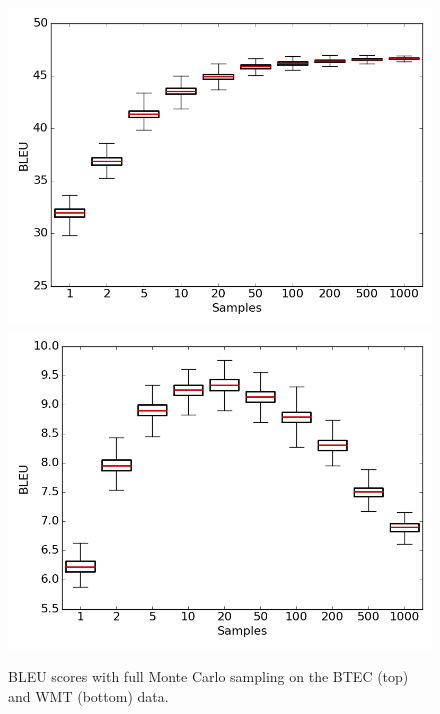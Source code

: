 \documentclass[11pt,a4paper]{article}
\begin{document}
\begin{figure}
\centering
\includegraphics[scale=0.8]{mc_btec.png}
\includegraphics[scale=0.8]{mc_wmt.png}
\caption{BLEU scores with full Monte Carlo sampling on the BTEC (top) and WMT (bottom) data.}
\label{fig:monte_carlo}
\end{figure}
\end{document}

